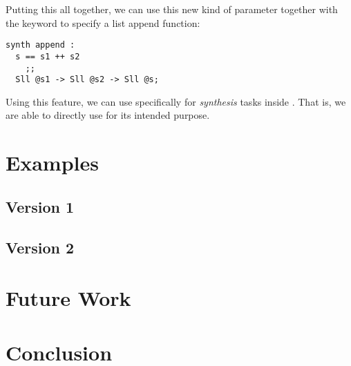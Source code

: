 \documentclass[acmsmall]{acmart}
\begin{document}
\noindent
Putting this all together, we can use this new kind of parameter together with the \synth{} keyword to specify a list append function:

\begin{lstlisting}
synth append :
  s == s1 ++ s2
    ;;
  Sll @s1 -> Sll @s2 -> Sll @s;
\end{lstlisting}

\noindent
Using this feature, we can use \SuSLik{} specifically for \textit{synthesis} tasks inside \Pika. That is, we are able to directly use \SuSLik{} for its intended purpose.

\section{Examples}
\label{sec:examples}

\subsection{Version 1}

\subsection{Version 2}

\section{Future Work}
\label{sec:future-work}

\section{Conclusion}
\label{sec:conclusion}
\end{document}
